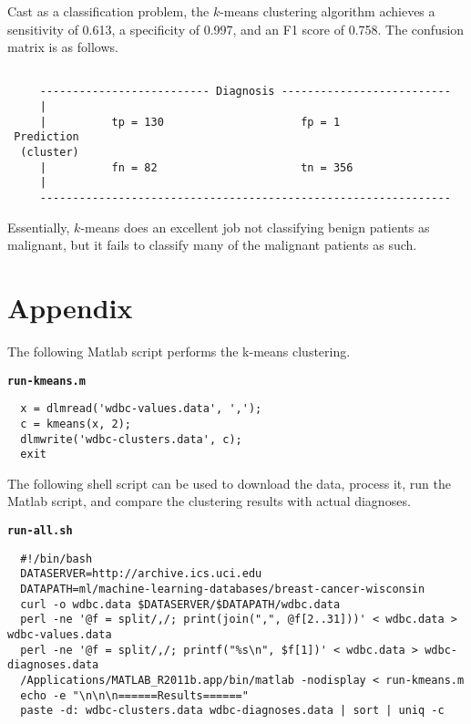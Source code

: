 \documentclass[a4paper, 10pt]{article}
\newcounter{prob_num}
\begin{document}
Cast as a classification problem, the $k$-means clustering algorithm achieves a sensitivity of 0.613, a specificity of 0.997, and an F1 score of 0.758. The confusion matrix is as follows.
\begin{verbatim}

     -------------------------- Diagnosis --------------------------
     |
     |          tp = 130                     fp = 1
 Prediction
  (cluster)
     |          fn = 82                      tn = 356
     |
     ---------------------------------------------------------------

\end{verbatim}
Essentially, $k$-means does an excellent job not classifying benign patients as malignant, but it fails to classify many of the malignant patients as such.

\section*{Appendix}
The following Matlab script performs the k-means clustering.

\bigskip
\textbf{\texttt{run-kmeans.m}}
\begin{verbatim}
  x = dlmread('wdbc-values.data', ',');
  c = kmeans(x, 2);
  dlmwrite('wdbc-clusters.data', c);
  exit
\end{verbatim}
\bigskip

The following shell script can be used to download the data, process it, run the Matlab script, and compare the clustering results with actual diagnoses.

\bigskip
\textbf{\texttt{run-all.sh}}
\begin{verbatim}
  #!/bin/bash
  DATASERVER=http://archive.ics.uci.edu
  DATAPATH=ml/machine-learning-databases/breast-cancer-wisconsin
  curl -o wdbc.data $DATASERVER/$DATAPATH/wdbc.data
  perl -ne '@f = split/,/; print(join(",", @f[2..31]))' < wdbc.data > wdbc-values.data
  perl -ne '@f = split/,/; printf("%s\n", $f[1])' < wdbc.data > wdbc-diagnoses.data
  /Applications/MATLAB_R2011b.app/bin/matlab -nodisplay < run-kmeans.m
  echo -e "\n\n\n======Results======"
  paste -d: wdbc-clusters.data wdbc-diagnoses.data | sort | uniq -c
\end{verbatim}
\bigskip
\end{document}
